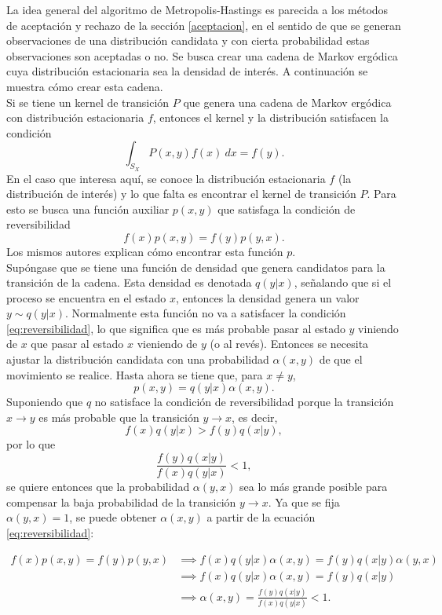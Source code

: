 \documentclass[11pt,a4paper]{article}
\begin{document}
La idea general del algoritmo de Metropolis-Hastings es parecida a los métodos de aceptación y rechazo de la sección \ref{aceptacion}, en el sentido de que se generan observaciones de una distribución candidata y con cierta probabilidad estas observaciones son aceptadas o no. Se busca crear una cadena de Markov ergódica cuya distribución estacionaria sea la densidad de interés. A continuación se muestra cómo crear esta cadena.\\

Si se tiene un kernel de transición $P$ que genera una cadena de Markov ergódica con distribución estacionaria $f$, entonces el kernel y la distribución satisfacen la condición \citep{chib_mh}
$$\int_{S_X} P(x, y)f(x) \ dx = f(y).$$ En el caso que interesa aquí, se conoce la distribución estacionaria $f$ (la distribución de interés) y lo que falta es encontrar el kernel de transición $P$. Para esto se busca una función auxiliar $p(x, y)$ que satisfaga la condición de reversibilidad \citep{chib_mh}
\begin{equation} \label{eq:reversibilidad}
f(x)p(x, y) = f(y)p(y, x).
\end{equation}
Los mismos autores explican cómo encontrar esta función $p$.\\

Supóngase que se tiene una función de densidad que genera candidatos para la transición de la cadena. Esta densidad es denotada $q(y|x)$, señalando que si el proceso se encuentra en el estado $x$, entonces la densidad genera un valor $y \sim q(y|x)$. Normalmente esta función no va a satisfacer la condición \eqref{eq:reversibilidad}, lo que significa que es más probable pasar al estado $y$ viniendo de $x$ que pasar al estado $x$ vieniendo de $y$ (o al revés). Entonces se necesita ajustar la distribución candidata con una probabilidad $\alpha (x, y)$ de que el movimiento se realice. Hasta ahora se tiene que, para $x \neq y$, $$p(x, y) = q(y | x) \alpha (x, y).$$ Suponiendo que $q$ no satisface la condición de reversibilidad porque la transición $x \to y$ es más probable que la transición $y \to x$, es decir, $$f(x)q(y|x) > f(y)q(x|y),$$ por lo que $$\frac{f(y)q(x|y)}{f(x)q(y|x)} < 1,$$ se quiere entonces que la probabilidad $\alpha(y, x)$ sea lo más grande posible para compensar la baja probabilidad de la transición $y \to x$. Ya que se fija $\alpha(y, x) = 1$, se puede obtener $\alpha(x, y)$ a partir de la ecuación \eqref{eq:reversibilidad}:

\begin{align*}
f(x)p(x, y) = f(y) p(y, x) &\implies f(x) q(y|x) \alpha(x, y) = f(y) q(x|y)\alpha (y, x)\\
&\implies f(x) q(y|x) \alpha(x, y) = f(y) q(x|y)\\
&\implies \alpha(x, y) = \frac{f(y)q(x|y)}{f(x)q(y|x)} < 1.
\end{align*}
\end{document}
